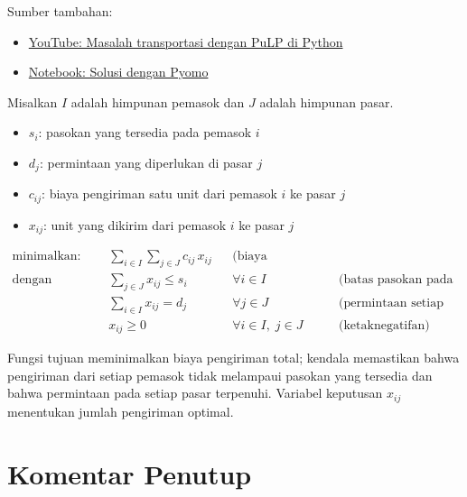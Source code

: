 \noindent Sumber tambahan:
\begin{itemize}
\item \href{https://www.youtube.com/watch?v=Jr7LI-sUEmo}{YouTube: Masalah transportasi dengan PuLP di Python}
\item \href{https://nbviewer.jupyter.org/github/Pyomo/PyomoGallery/blob/master/transport/transport.ipynb}{Notebook: Solusi dengan Pyomo}
\end{itemize}

Misalkan $I$ adalah himpunan pemasok dan $J$ adalah himpunan pasar.

\begin{itemize}
\item $s_i$: pasokan yang tersedia pada pemasok $i$
\item $d_j$: permintaan yang diperlukan di pasar $j$
\item $c_{ij}$: biaya pengiriman satu unit dari pemasok $i$ ke pasar $j$
\end{itemize}

\begin{itemize}
\item $x_{ij}$: unit yang dikirim dari pemasok $i$ ke pasar $j$
\end{itemize}

\begin{align*}
\text{minimalkan:} \quad &\sum_{i\in I}\sum_{j \in J} c_{ij}\,x_{ij} && \text{(biaya pengiriman total)}\\
\text{dengan kendala:} \quad &\sum_{j\in J} x_{ij} \leq s_i && \forall i \in I && \text{(batas pasokan pada setiap pemasok)}\\
&\sum_{i\in I} x_{ij} = d_j && \forall j \in J && \text{(permintaan setiap pasar terpenuhi)}\\
& x_{ij} \geq 0 && \forall i\in I,\; j\in J && \text{(ketaknegatifan)}
\end{align*}

Fungsi tujuan meminimalkan biaya pengiriman total; kendala memastikan bahwa pengiriman dari setiap pemasok tidak melampaui pasokan yang tersedia dan bahwa permintaan pada setiap pasar terpenuhi. Variabel keputusan $x_{ij}$ menentukan jumlah pengiriman optimal.

\section*{Komentar Penutup}

